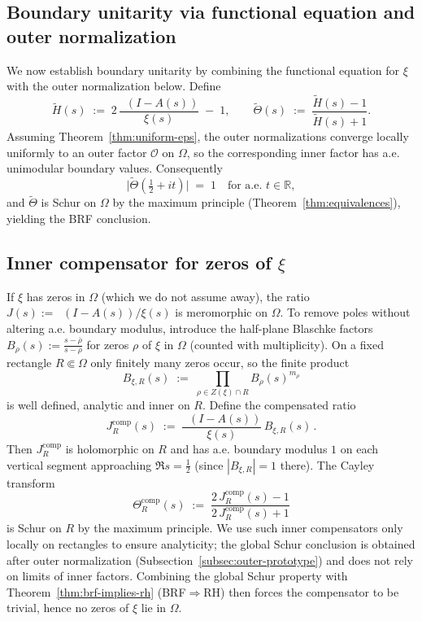 \documentclass[11pt]{article}
\theoremstyle{remark}
\DeclareMathOperator{\dettwo}{det_2}
\begin{document}
\subsection{Boundary unitarity via functional equation and outer normalization}\label{subsec:boundary-unitarity}
We now establish boundary unitarity by combining the functional equation for $\xi$ with the outer normalization below. Define
\[
 \widetilde H(s)\;:=\;2\,\frac{\dettwo(I-A(s))}{\xi(s)}\; -\;1,\qquad \widetilde \Theta(s)\;:=\;\frac{\widetilde H(s)-1}{\widetilde H(s)+1}.
\]
Assuming Theorem~\ref{thm:uniform-eps}, the outer normalizations converge locally uniformly to an outer factor $\mathcal O$ on $\Omega$, so the corresponding inner factor has a.e. unimodular boundary values. Consequently
\begin{equation}\label{eq:unitarity}
 \big|\widetilde \Theta(\tfrac12+it)\big|\;=\;1\quad\text{for a.e. }t\in\mathbb R,
\end{equation}
and $\widetilde \Theta$ is Schur on $\Omega$ by the maximum principle (Theorem~\ref{thm:equivalences}), yielding the BRF conclusion.

\subsection{Inner compensator for zeros of $\xi$}\label{subsec:bl-compensator}
If $\xi$ has zeros in $\Omega$ (which we do not assume away), the ratio $J(s):=\dettwo(I-A(s))/\xi(s)$ is meromorphic on $\Omega$. To remove poles without altering a.e. boundary modulus, introduce the half-plane Blaschke factors $B_{\rho}(s):=\frac{s-\overline{\rho}}{s-\rho}$ for zeros $\rho$ of $\xi$ in $\Omega$ (counted with multiplicity). On a fixed rectangle $R\Subset\Omega$ only finitely many zeros occur, so the finite product
\[
 B_{\xi,R}(s)\;:=\;\prod_{\rho\in Z(\xi)\cap R} B_{\rho}(s)^{m_{\rho}}
\]
is well defined, analytic and inner on $R$. Define the compensated ratio
\[
 J_R^{\mathrm{comp}}(s)\;:=\;\frac{\dettwo(I-A(s))}{\xi(s)}\,B_{\xi,R}(s)\,.
\]
Then $J_R^{\mathrm{comp}}$ is holomorphic on $R$ and has a.e. boundary modulus $1$ on each vertical segment approaching $\Re s=\tfrac12$ (since $|B_{\xi,R}|=1$ there). The Cayley transform
\[
 \Theta_R^{\mathrm{comp}}(s)\;:=\;\frac{2\,J_R^{\mathrm{comp}}(s)-1}{2\,J_R^{\mathrm{comp}}(s)+1}
\]
is Schur on $R$ by the maximum principle. We use such inner compensators only locally on rectangles to ensure analyticity; the global Schur conclusion is obtained after outer normalization (Subsection~\ref{subsec:outer-prototype}) and does not rely on limits of inner factors. Combining the global Schur property with Theorem~\ref{thm:brf-implies-rh} (BRF$\Rightarrow$RH) then forces the compensator to be trivial, hence no zeros of $\xi$ lie in $\Omega$.
\end{document}
